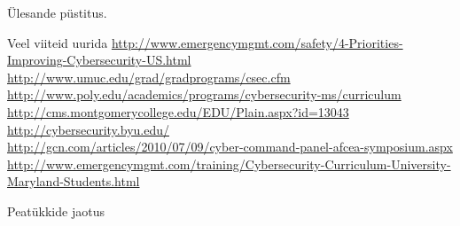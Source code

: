 Ülesande püstitus.

Veel viiteid uurida 
\url{http://www.emergencymgmt.com/safety/4-Priorities-Improving-Cybersecurity-US.html}\\
\url{http://www.umuc.edu/grad/gradprograms/csec.cfm}
\\
\url{http://www.poly.edu/academics/programs/cybersecurity-ms/curriculum}\\
\url{http://cms.montgomerycollege.edu/EDU/Plain.aspx?id=13043}\\
\url{http://cybersecurity.byu.edu/}\\
\url{http://gcn.com/articles/2010/07/09/cyber-command-panel-afcea-symposium.aspx}\\
\url{http://www.emergencymgmt.com/training/Cybersecurity-Curriculum-University-Maryland-Students.html}\\

\par Peatükkide jaotus